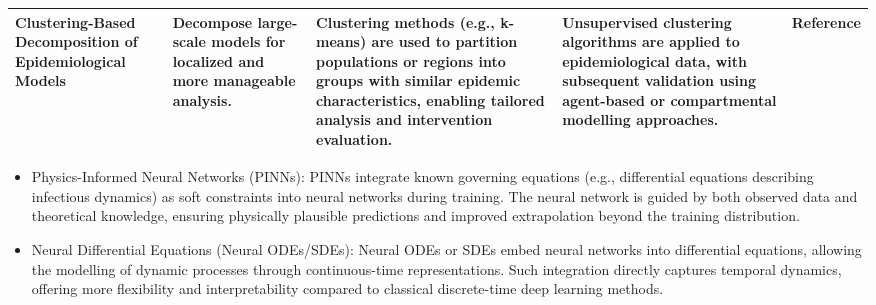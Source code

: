 \begin{center}
\begin{longtable}{|p{3cm}|p{3cm}|p{3cm}|p{3cm}|p{3cm}|}
Clustering-Based Decomposition of Epidemiological Models & Decompose large-scale models for localized and more manageable analysis. & Clustering methods (e.g., k-means) are used to partition populations or regions into groups with similar epidemic characteristics, enabling tailored analysis and intervention evaluation. & Unsupervised clustering algorithms are applied to epidemiological data, with subsequent validation using agent-based or compartmental modelling approaches. & Reference \cite{bertozzi-villa_archetypes_2023} \\ \hline

\end{longtable}
\end{center}



\newpage


\begin{itemize}
    \item Physics-Informed Neural Networks (PINNs): PINNs integrate known governing equations (e.g., differential equations describing infectious dynamics) as soft constraints into neural networks during training. The neural network is guided by both observed data and theoretical knowledge, ensuring physically plausible predictions and improved extrapolation beyond the training distribution.
    \item Neural Differential Equations (Neural ODEs/SDEs): Neural ODEs or SDEs embed neural networks into differential equations, allowing the modelling of dynamic processes through continuous-time representations. Such integration directly captures temporal dynamics, offering more flexibility and interpretability compared to classical discrete-time deep learning methods.
\end{itemize}


